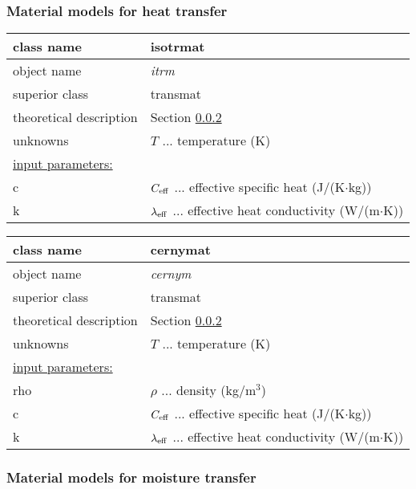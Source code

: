\subsubsection{Material models for heat transfer}

\begin{center}
\begin{tabular}{|l|l|}
\hline
class name & {\sf isotrmat}\index{class!{\sf isotrmat}}
\\ \hline
object name & {\it itrm}\index{instance!{\it isotransmat}}
\\ \hline
superior class & {\sf transmat}
\\ \hline
theoretical description & Section \ref{}
\\ \hline
unknowns & $T$ ... temperature (K)
\\ \hline
\underline{input parameters:} & 
\\
c & $C_{\rm eff}$ ...  effective specific heat (J/(K$\cdot$kg))
\\
k & $\lambda_{\rm eff}$ ...  effective heat conductivity (W/(m$\cdot$K))
\\ \hline
\end{tabular}
\end{center}


\begin{center}
\begin{tabular}{|l|l|}
\hline
class name & {\sf cernymat}\index{class!{\sf cernymat}}
\\ \hline
object name & {\it cernym}\index{instance!{\it cernyconcrete}}
\\ \hline
superior class & {\sf transmat}
\\ \hline
theoretical description & Section \ref{}
\\ \hline
unknowns & $T$ ... temperature (K)
\\ \hline
\underline{input parameters:}  & 
\\
rho & $\rho$ ... density (kg/m$^3$)
\\
c & $C_{\rm eff}$ ... effective specific heat (J/(K$\cdot$kg))
\\
k & $\lambda_{\rm eff}$ ... effective heat conductivity (W/(m$\cdot$K))
\\ \hline
\end{tabular}
\end{center}


\subsubsection{Material models for moisture transfer}


